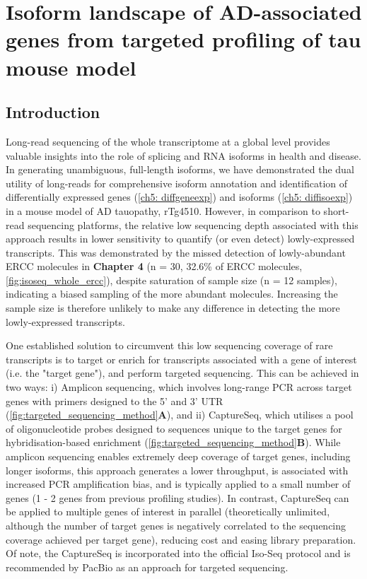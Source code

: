 \chapter{Isoform landscape of AD-associated genes from targeted profiling of tau mouse model}\label{ch: targeted_transcriptome}
\label{targetedmousetranscriptome}


\section{Introduction}
Long-read sequencing of the whole transcriptome at a global level provides valuable insights into the role of splicing and RNA isoforms in health and disease\cite{DePaoli-Iseppi2021}. In generating unambiguous, full-length isoforms, we have demonstrated the dual utility of long-reads for comprehensive isoform annotation and identification of differentially expressed genes (\cref{ch5: diffgeneexp}) and isoforms (\cref{ch5: diffisoexp}) in a mouse model of AD tauopathy, rTg4510. However, in comparison to short-read sequencing platforms, the relative low sequencing depth associated with this approach results in lower sensitivity to quantify (or even detect) lowly-expressed transcripts\cite{Stark2019}. This was demonstrated by the missed detection of lowly-abundant ERCC molecules in \textbf{Chapter 4} (n = 30, 32.6\% of ERCC molecules, \cref{fig:isoseq_whole_ercc}), despite saturation of sample size (n = 12 samples), indicating a biased sampling of the more abundant molecules. Increasing the sample size is therefore unlikely to make any difference in detecting the more lowly-expressed transcripts. 

One established solution to circumvent this low sequencing coverage of rare transcripts is to target or enrich for transcripts associated with a gene of interest (i.e. the "target gene"), and perform targeted sequencing\cite{Sheynkman2020}. This can be achieved in two ways\cite{DePaoli-Iseppi2021}: i) Amplicon sequencing, which involves long-range PCR across target genes with primers designed to the 5' and 3' UTR (\cref{fig:targeted_sequencing_method}\textbf{A}), and ii) CaptureSeq, which utilises a pool of oligonucleotide probes designed to sequences unique to the target genes for hybridisation-based enrichment (\cref{fig:targeted_sequencing_method}\textbf{B}). While amplicon sequencing enables extremely deep coverage of target genes, including longer isoforms, this approach generates a lower throughput, is associated with increased PCR amplification bias, and is typically applied to a small number of genes (1 - 2 genes from previous profiling studies\cite{Treutlein2014,Schreiner2014}). In contrast, CaptureSeq can be applied to multiple genes of interest in parallel (theoretically unlimited, although the number of target genes is negatively correlated to the sequencing coverage achieved per target gene), reducing cost and easing library preparation. Of note, the CaptureSeq is incorporated into the official Iso-Seq protocol and is recommended by PacBio as an approach for targeted sequencing\cite{Tseng2019}.  


